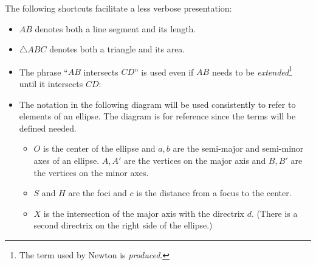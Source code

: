 The following shortcuts facilitate a less verbose presentation:
\begin{itemize}

\item $AB$ denotes both a line segment and its length.
\item $\triangle ABC$ denotes both a triangle and its area.
\item The phrase ``$AB$ intersects $CD$'' is used even if $AB$ needs to be \emph{extended}\footnote{The term used by Newton is \emph{produced}.} until it intersects $CD$:
\begin{center}
\end{center}
\item The notation in the following diagram will be used consistently to refer to elements of an ellipse. The diagram is for reference since the terms will be defined needed.
\begin{itemize}
\item $O$ is the center of the ellipse and $a,b$ are the semi-major and semi-minor axes of an ellipse. $A,A'$ are the vertices on the major axis and $B,B'$ are the vertices on the minor axes.
\item $S$ and $H$ are the foci and $c$ is the distance from a focus to the center.
\item $X$ is the intersection of the major axis with the directrix $d$. (There is a second directrix on the right side of the ellipse.)
\end{itemize}
\end{itemize}


